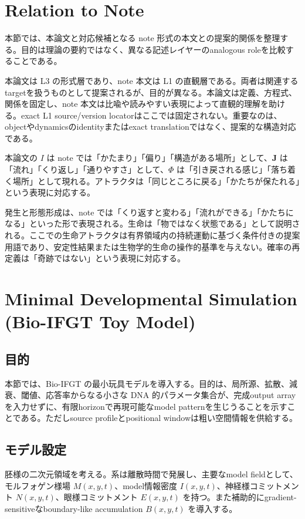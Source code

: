 \documentclass[11pt]{ltjsarticle}
\newcommand{\I}{I}
\newcommand{\J}{\mathbf{J}}
\newcommand{\PhiI}{\Phi}
\begin{document}
\section{Relation to Note}

本節では、本論文と対応候補となる note 形式の本文との提案的関係を整理する。目的は理論の要約ではなく、異なる記述レイヤーのanalogous roleを比較することである。

本論文は L3 の形式層であり、note 本文は L1 の直観層である。両者は関連するtargetを扱うものとして提案されるが、目的が異なる。本論文は定義、方程式、関係を固定し、note 本文は比喩や読みやすい表現によって直観的理解を助ける。exact L1 source/version locatorはここでは固定されない。重要なのは、objectやdynamicsのidentityまたはexact translationではなく、提案的な構造対応である。

本論文の \(\I\) は note では「かたまり」「偏り」「構造がある場所」として、\(\J\) は「流れ」「くり返し」「通りやすさ」として、\(\PhiI\) は「引き戻される感じ」「落ち着く場所」として現れる。アトラクタは「同じところに戻る」「かたちが保たれる」という表現に対応する。

発生と形態形成は、note では「くり返すと変わる」「流れができる」「かたちになる」といった形で表現される。生命は「物ではなく状態である」として説明される。ここでの生命アトラクタは有界領域内の持続運動に基づく条件付きの提案用語であり、安定性結果または生物学的生命の操作的基準を与えない。確率の再定義は「奇跡ではない」という表現に対応する。

\section{Minimal Developmental Simulation (Bio-IFGT Toy Model)}

\subsection{目的}

本節では、Bio-IFGT の最小玩具モデルを導入する。目的は、局所源、拡散、減衰、閾値、応答率からなる小さな DNA 的パラメータ集合が、完成output arrayを入力せずに、有限horizonで再現可能なmodel patternを生じうることを示すことである。ただしsource profileとpositional windowは粗い空間情報を供給する。

\subsection{モデル設定}

胚様の二次元領域を考える。系は離散時間で発展し、主要なmodel fieldとして、モルフォゲン様場 \(M(x,y,t)\)、model情報密度 \(\I(x,y,t)\)、神経様コミットメント \(N(x,y,t)\)、眼様コミットメント \(E(x,y,t)\) を持つ。また補助的にgradient-sensitiveなboundary-like accumulation \(B(x,y,t)\) を導入する。
\end{document}
